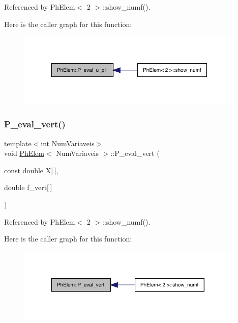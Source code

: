 Referenced by Ph\+Elem$<$ 2 $>$\+::show\+\_\+numf().

Here is the caller graph for this function\+:
\nopagebreak
\begin{figure}[H]
\begin{center}
\leavevmode
\includegraphics[width=309pt]{classPhElem_a69032d622789084c4416981e2fceb80c_icgraph}
\end{center}
\end{figure}
\mbox{\label{classPhElem_a115839e26aca8569ede2966db01926f1}} 
\subsubsection{\texorpdfstring{P\+\_\+eval\+\_\+vert()}{P\_eval\_vert()}}
{\footnotesize\ttfamily template$<$int Num\+Variaveis$>$ \\
void \hyperlink{classPhElem}{Ph\+Elem}$<$ Num\+Variaveis $>$\+::P\+\_\+eval\+\_\+vert (\begin{DoxyParamCaption}\item[{const double}]{X\mbox{[}$\,$\mbox{]},  }\item[{double}]{f\+\_\+vert\mbox{[}$\,$\mbox{]} }\end{DoxyParamCaption})}



Referenced by Ph\+Elem$<$ 2 $>$\+::show\+\_\+numf().

Here is the caller graph for this function\+:
\nopagebreak
\begin{figure}[H]
\begin{center}
\leavevmode
\includegraphics[width=305pt]{classPhElem_a115839e26aca8569ede2966db01926f1_icgraph}
\end{center}
\end{figure}
\mbox{\label{classPhElem_a1ae41c2b94f8faca55505d25e899f724}} 
